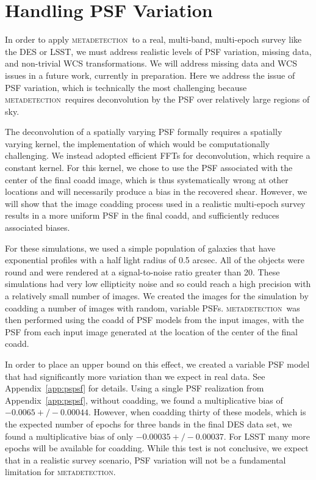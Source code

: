 \documentclass[draft, iop, twocolappendix, appendixfloats, numberedappendix, apj]{hackemulateapj}
\newcommand{\mdet}{\textsc{metadetection}}
\begin{document}
\section{Handling PSF Variation}
\label{sec:psfvar}

In order to apply \mdet\ to a real, multi-band, multi-epoch survey like the DES
or LSST, we must address realistic levels of PSF variation, missing data, and
non-trivial WCS transformations. We will address missing data and WCS issues in
a future work, currently in preparation. Here we address the issue of PSF
variation, which is technically the most challenging because \mdet\ requires
deconvolution by the PSF over relatively large regions of sky.

The deconvolution of a spatially varying PSF formally requires a spatially
varying kernel, the implementation of which would be computationally
challenging.  We instead adopted efficient FFTs for deconvolution, which require
a constant kernel.  For this kernel, we chose to use the PSF associated with
the center of the final coadd image, which is thus systematically wrong at
other locations and will necessarily produce a bias in the recovered shear.
However, we will show that the image coadding process used in a realistic
multi-epoch survey results in a more uniform PSF in the final coadd, and
sufficiently reduces associated biases.

For these simulations, we used a simple population of galaxies that have
exponential profiles with a half light radius of 0.5 arcsec. All of the objects
were round and were rendered at a signal-to-noise ratio greater than 20. These
simulations had very low ellipticity noise and so could reach a high precision
with a relatively small number of images. We created the images for the
simulation by coadding a number of images with random, variable PSFs.  \mdet\
was then performed using the coadd of PSF models from the input images, with
the PSF from each input image generated at the location of the center of the
final coadd.

In order to place an upper bound on this effect, we created a variable PSF
model that had significantly more variation than we expect in real data. See
Appendix~\ref{app:pspsf} for details.  Using a single PSF realization from
Appendix~\ref{app:pspsf}, without coadding, we found a multiplicative bias of
$-0.0065 +/- 0.00044$.  However, when coadding thirty of these models, which is
the expected number of epochs for three bands in the final DES data set, we
found a multiplicative bias of only $-0.00035 +/- 0.00037$.  For LSST many more
epochs will be available for coadding.   While this test is not conclusive, we
expect that in a realistic survey scenario, PSF variation will not be a
fundamental limitation for \mdet.
\end{document}
